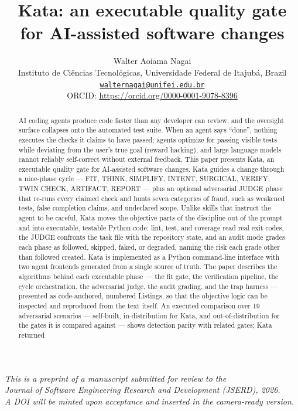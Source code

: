 \documentclass[11pt]{article}
\title{\textbf{Kata: an executable quality gate for AI-assisted software changes}}
\author{
  Walter Aoiama Nagai \\
  \small Instituto de Ci\^encias Tecnol\'ogicas, Universidade Federal de Itajub\'a, Brazil \\
  \small \href{mailto:walternagai@unifei.edu.br}{\texttt{walternagai@unifei.edu.br}} \\
  \small ORCID: \url{https://orcid.org/0000-0001-9078-8396}
}
\date{}
\begin{document}
\maketitle

\begin{center}
\footnotesize\itshape
This is a preprint of a manuscript submitted for review to the\\
Journal of Software Engineering Research and Development (JSERD), 2026.\\
A DOI will be minted upon acceptance and inserted in the camera-ready version.
\end{center}
\bigskip

\begin{abstract}
AI coding agents produce code faster than any developer can review, and the
oversight surface collapses onto the automated test suite. When an agent says
``done'', nothing executes the checks it claims to have passed; agents
optimize for passing visible tests while deviating from the user's true goal
(reward hacking), and large language models cannot reliably self-correct
without external feedback. This paper presents Kata, an executable
quality gate for AI-assisted software changes. Kata guides a change through a
nine-phase cycle --- FIT, THINK, SIMPLIFY, INTENT, SURGICAL, VERIFY, TWIN
CHECK, ARTIFACT, REPORT --- plus an optional adversarial JUDGE phase that
re-runs every claimed check and hunts seven categories of fraud, such as
weakened tests, false completion claims, and undeclared scope. Unlike skills
that instruct the agent to be careful, Kata moves the objective parts of the
discipline out of the prompt and into executable, testable Python code: lint,
test, and coverage read real exit codes, the JUDGE confronts the task file
with the repository state, and an audit mode grades each phase as followed,
skipped, faked, or degraded, naming the risk each grade other than followed
created. Kata is
implemented as a Python command-line interface with two agent frontends
generated from a single source of truth. The paper describes the algorithms
behind each executable phase --- the fit gate, the verification pipeline, the
cycle orchestration, the adversarial judge, the audit grading, and the trap
harness --- presented as code-anchored, numbered Listings, so that the
objective logic can be inspected and reproduced from the text itself. An
executed comparison over 19
adversarial scenarios --- self-built, in-distribution for Kata, and out-of-distribution
for the gates it is compared against --- shows detection parity with related gates; Kata returned

\end{abstract}
\end{document}
